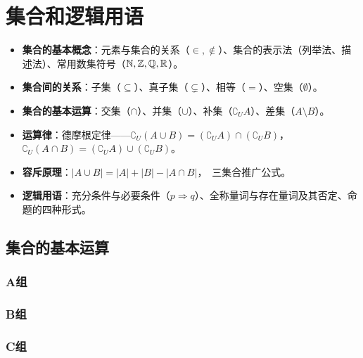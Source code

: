 \chapter{集合和逻辑用语}

\begin{knowledgeframe}
\begin{itemize}
	\item \textbf{集合的基本概念}：元素与集合的关系（$\in, \notin$）、集合的表示法（列举法、描述法）、常用数集符号（$\mathbb{N}, \mathbb{Z}, \mathbb{Q}, \mathbb{R}$）。
	\item \textbf{集合间的关系}：子集（$\subseteq$）、真子集（$\subsetneq$）、相等（$=$）、空集（$\emptyset$）。
	\item \textbf{集合的基本运算}：交集（$\cap$）、并集（$\cup$）、补集（$\complement_U A$）、差集（$A \setminus B$）。
	\item \textbf{运算律}：德摩根定律——$\complement_U(A \cup B) = (\complement_U A) \cap (\complement_U B)$，\ $\complement_U(A \cap B) = (\complement_U A) \cup (\complement_U B)$。
	\item \textbf{容斥原理}：$|A \cup B| = |A| + |B| - |A \cap B|$，\ 三集合推广公式。
	\item \textbf{逻辑用语}：充分条件与必要条件（$p \Rightarrow q$）、全称量词与存在量词及其否定、命题的四种形式。
\end{itemize}
\end{knowledgeframe}

\section{集合的基本运算}

\startexercise

\subsection*{A组}





\subsection*{B组}






\subsection*{C组}

